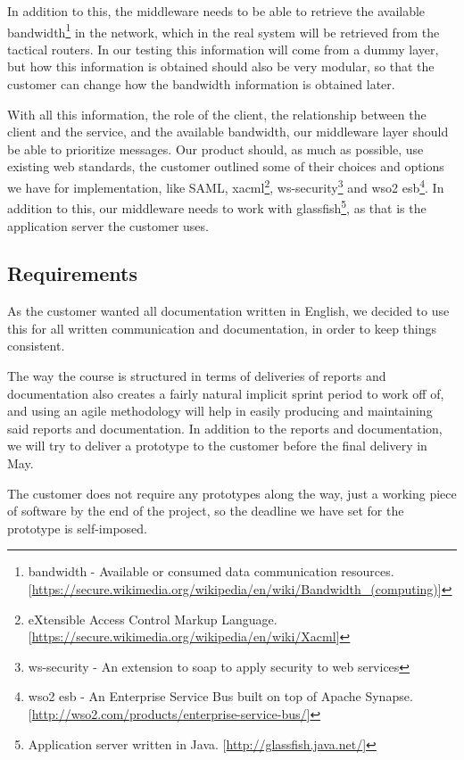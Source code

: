     In addition to this, the middleware needs to be able to retrieve the available \gls{bandwidth}\footnote{\Gls{bandwidth} - Available or consumed data communication resources.[\url{https://secure.wikimedia.org/wikipedia/en/wiki/Bandwidth_(computing)}]} in the network, which in the real system will be retrieved from the tactical routers. In our testing this information will come from a dummy layer, but how this information is obtained should also be very modular, so that the customer can change how the bandwidth information is obtained later.

    With all this information, the role of the client, the relationship between the client and the service, and the available bandwidth, our middleware layer should be able to prioritize messages. Our product should, as much as possible, use existing web standards, the customer outlined some of their choices and options we have for implementation, like SAML, \gls{xacml}\footnote{eXtensible Access Control Markup Language. [\url{https://secure.wikimedia.org/wikipedia/en/wiki/Xacml}]}, \gls{ws-security}\footnote{\gls{ws-security} - An extension to \gls{soap} to apply security to web services} and \gls{wso2 esb}\footnote{\gls{wso2 esb} - An Enterprise Service Bus built on top of Apache Synapse. [\url{http://wso2.com/products/enterprise-service-bus/}]}. In addition to this, our middleware needs to work with \gls{glassfish}\footnote{Application server written in Java. [\url{http://glassfish.java.net/}]}, as that is the application server the customer uses.
   
    \subsection{Requirements}\label{Requirements}
    As the customer wanted all documentation written in English, we decided to use this for all written communication and documentation, in order to keep things consistent.
    
    The way the course is structured in terms of deliveries of reports and documentation also creates a fairly natural implicit sprint period to work off of, and using an agile methodology will help in easily producing and maintaining said reports and documentation. In addition to the  reports and documentation, we will try to deliver a prototype to the customer before the final delivery in May.

    The customer does not require any prototypes along the way, just a working piece of software by the end of the project, so the deadline we have set for the prototype is self-imposed. 

